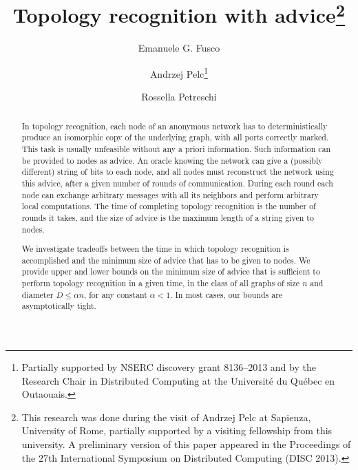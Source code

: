 \documentclass{article}
\begin{document}
\title{
Topology recognition with advice\thanks{This research was done during the visit of Andrzej Pelc at  Sapienza, University of Rome,  partially supported by a visiting fellowship from this university. A preliminary version of this paper appeared in the
Proceedings of the 27th International Symposium on Distributed Computing (DISC 2013).}
}

\author[1]{Emanuele G. Fusco}
\author[2]{Andrzej Pelc\footnote{Partially supported by NSERC discovery grant 8136--2013 
and by the Research Chair in Distributed Computing at the
Universit\'e du Qu\'ebec en Outaouais.}}
\author[3]{Rossella Petreschi}
\date{}
\maketitle

\begin{abstract}

In topology recognition,  each node of an anonymous network has to deterministically produce an isomorphic copy of
the underlying graph, with all ports correctly marked. This task is usually unfeasible without any a priori information.
Such information can be provided to nodes as advice. An oracle knowing the network can give a (possibly different)
string of bits to each node, and all nodes must reconstruct the network using this advice, after a given number of rounds
of communication. During each round each node can exchange arbitrary messages with all its neighbors and perform
arbitrary local computations. The time of completing topology recognition is the number of rounds it takes, and the size
of advice is the maximum length of a string given to nodes.

We investigate tradeoffs between the time in which topology recognition is accomplished and the minimum
size of advice that has to be given  to nodes. We provide upper and lower bounds on the minimum size of advice
that is sufficient to perform topology recognition in a given time, in the class of all graphs of size $n$ and diameter
$D\le \alpha n$, for any constant $\alpha< 1$. In most cases, our bounds are asymptotically tight.\end{abstract} 
\end{document}
